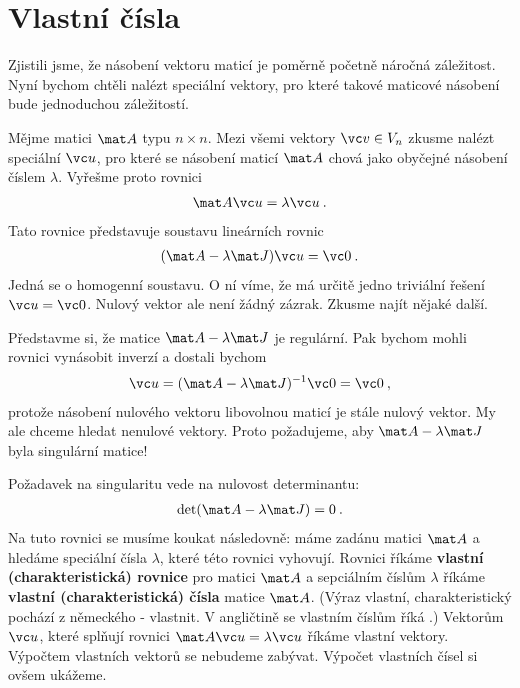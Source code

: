 \section*{Vlastní čísla}

Zjistili jsme, že násobení vektoru maticí je poměrně početně náročná záležitost. Nyní bychom chtěli nalézt speciální vektory, pro které takové maticové násobení bude jednoduchou záležitostí.

Mějme matici $\mat A$ typu $n \times n$. Mezi všemi vektory $\vc v \in V_n$ zkusme nalézt speciální $\vc u$, pro které se násobení maticí $\mat A$ chová jako obyčejné násobení číslem $\lambda$. Vyřešme proto rovnici
\begin{align}
    \mat A \vc u = \lambda \vc u \:.
\end{align}
Tato rovnice představuje soustavu lineárních rovnic
\begin{align}
    (\mat A - \lambda \mat J) \vc u = \vc 0 \:.
\end{align}
Jedná se o homogenní soustavu. O ní víme, že má určitě jedno triviální řešení $\vc u = \vc 0$. Nulový vektor ale není žádný zázrak. Zkusme najít nějaké další.

Představme si, že matice $\mat A - \lambda \mat J$ je regulární. Pak bychom mohli rovnici vynásobit inverzí a dostali bychom
\begin{align}
    \vc u = (\mat A - \lambda \mat J)^{-1} \vc 0 = \vc 0 \:,
\end{align}
protože násobení nulového vektoru libovolnou maticí je stále nulový vektor. My ale chceme hledat nenulové vektory. Proto požadujeme, aby $\mat A - \lambda \mat J$ byla singulární matice!

Požadavek na singularitu vede na nulovost determinantu:
\begin{align}
    \det (\mat A - \lambda \mat J) = 0 \:.
\end{align}
Na tuto rovnici se musíme koukat následovně: máme zadánu matici $\mat A$ a hledáme speciální čísla $\lambda$, které této rovnici vyhovují.
Rovnici říkáme \textbf{vlastní (charakteristická) rovnice} pro matici $\mat A$ a sepciálním číslům $\lambda$ říkáme \textbf{vlastní (charakteristická) čísla} matice $\mat A$. (Výraz vlastní, charakteristický pochází z německého  - vlastnit. V angličtině se vlastním číslům říká .) Vektorům $\vc u$, které splňují rovnici $\mat A \vc u =\lambda \vc u$ říkáme vlastní vektory. Výpočtem vlastních vektorů se nebudeme zabývat. Výpočet vlastních čísel si ovšem ukážeme.

